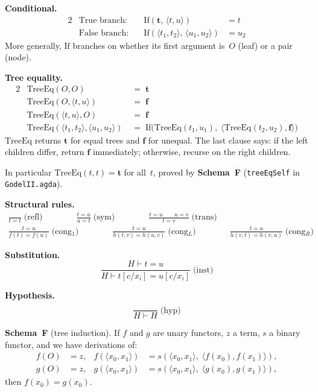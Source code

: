 \documentclass[11pt]{article}
\newcommand{\pair}[2]{\langle #1, #2 \rangle}
\newcommand{\trueT}{\mathbf{t}}
\newcommand{\falseT}{\mathbf{f}}
\newcommand{\SchemaF}{\textbf{Schema~F}}
\newcommand{\TreeEq}{\mathrm{TreeEq}}
\begin{document}
\noindent
\textbf{Conditional.}
\begin{alignat*}{2}
  &\text{True branch:}     &\quad \mathrm{If}(\trueT,\, \pair{t}{u}) &= t \\
  &\text{False branch:}     &\quad \mathrm{If}(\pair{t_1}{t_2},\, \pair{u_1}{u_2}) &= u_2
\end{alignat*}
More generally, $\mathrm{If}$ branches on whether its first
argument is~$O$ (leaf) or a pair (node).

\medskip\noindent
\textbf{Tree equality.}
\begin{alignat*}{2}
  &\TreeEq(O, O) &\;=\; \trueT \\
  &\TreeEq(O, \pair{t}{u}) &\;=\; \falseT \\
  &\TreeEq(\pair{t}{u}, O) &\;=\; \falseT \\
  &\TreeEq(\pair{t_1}{t_2}, \pair{u_1}{u_2})
    &\;=\; \mathrm{If}\bigl(\TreeEq(t_1, u_1),\;
         \pair{\TreeEq(t_2, u_2)}{\falseT}\bigr)
\end{alignat*}
$\TreeEq$ returns $\trueT$ for equal trees and $\falseT$ for
unequal.  The last clause says: if the left children differ, return
$\falseT$ immediately; otherwise, recurse on the right children.

In particular $\TreeEq(t, t) = \trueT$ for all~$t$,
proved by \SchemaF{} (\texttt{treeEqSelf} in \texttt{GodelII.agda}).

\medskip\noindent
\textbf{Structural rules.}
\begin{gather*}
  \frac{\phantom{t=t}}{t = t}\;\text{(refl)}
  \qquad\qquad
  \frac{t = u}{u = t}\;\text{(sym)}
  \qquad\qquad
  \frac{t = u \qquad u = v}{t = v}\;\text{(trans)}
  \\[8pt]
  \frac{t = u}{f(t) = f(u)}\;\text{(cong$_1$)}
  \qquad\qquad
  \frac{t = u}{h(t, v) = h(u, v)}\;\text{(cong$_L$)}
  \qquad\qquad
  \frac{t = u}{h(v, t) = h(v, u)}\;\text{(cong$_R$)}
\end{gather*}

\noindent
\textbf{Substitution.}
\[
  \frac{H \vdash t = u}
       {H \vdash t[c/x_i] = u[c/x_i]}
  \;\text{(inst)}
\]

\noindent
\textbf{Hypothesis.}
\[
  \frac{\phantom{H}}{H \vdash H}
  \;\text{(hyp)}
\]

\noindent
\textbf{\SchemaF} (tree induction).
If $f$ and $g$ are unary functors, $z$ a term, $s$ a binary functor,
and we have derivations of:
\begin{align*}
  f(O) &= z,  &  f(\pair{x_0}{x_1}) &= s(\pair{x_0}{x_1},\; \pair{f(x_0)}{f(x_1)}), \\
  g(O) &= z,  &  g(\pair{x_0}{x_1}) &= s(\pair{x_0}{x_1},\; \pair{g(x_0)}{g(x_1)}),
\end{align*}
then $f(x_0) = g(x_0)$.
\end{document}

